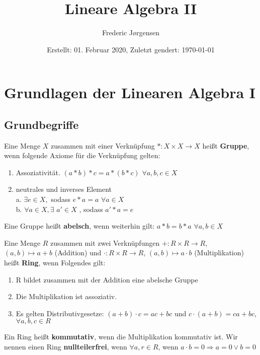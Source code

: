 \documentclass[9pt, a4paper, twocolumn, landscape]{article}
\title{Lineare Algebra II}
\author{Frederic Jørgensen}
\date{Erstellt: 01. Februar 2020, Zuletzt ge\aee ndert: \today \\                           %
	 \selectlanguage{ngerman}}
\begin{document}
\setlength{\abovedisplayskip}{2pt}
\setlength{\belowdisplayskip}{2pt}

\maketitle
\tableofcontents
\newpage
\begin{abstract}
	\centerline{}
\end{abstract}

\newpage
\section{Grundlagen der Linearen Algebra I}
\subsection{Grundbegriffe}

\begin{definition}
Eine Menge $X$ zusammen mit einer Verknüpfung $* : X \times X \to X $ heißt \textbf{Gruppe}, wenn folgende Axiome für die Verknüpfung gelten:
\begin{enumerate}
\item Assoziativität. $ (a*b)*c = a*(b*c) $ $ \forall a,b,c \in X$
\item neutrales und inverses Element
\\  a. $\exists e \in X,$ sodass $e*a = a $ $\forall a \in X$
\\  b. $\forall a \in X, \exists $ $ a' \in X$ , sodass $ a'*a = e$
\end{enumerate}
Eine Gruppe heißt \textbf{abelsch}, wenn weiterhin gilt: $ a*b = b*a $ $\forall a,b \in X$ 
\end{definition}

\begin{definition}
Eine Menge $R$ zusammen mit zwei Verknüpfungen 
$+ : R \times R \to R$, $(a,b) \mapsto a+b$ (Addition) und
$\cdot : R \times R \to R$, $(a,b) \mapsto a \cdot b$ (Multiplikation)
heißt \textbf{Ring}, wenn Folgendes gilt:
\begin{enumerate}
\item R bildet zusammen mit der Addition eine abelsche Gruppe
\item Die Multiplikation ist assoziativ.
\item Es gelten Distributivgesetze:
$ (a+b)\cdot c = ac + bc $ und $ c\cdot(a+b) = ca + bc$, $\forall a,b,c \in R$
\end{enumerate}
Ein Ring heißt \textbf{kommutativ}, wenn die Multiplikation kommutativ ist.
Wir nennen einen Ring \textbf{nullteilerfrei}, wenn $\forall a,r\in R$, wenn $a\cdot b = 0 \Rightarrow a=0 \lor b=0$ 
\end{definition}
\end{document}
